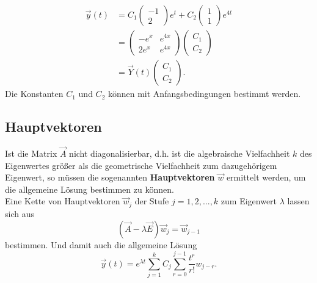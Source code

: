 \begin{align*}
\vec y(t) &= C_1 \begin{pmatrix}-1 \\ 2 \end{pmatrix} e^t + C_2  \begin{pmatrix}1 \\ 1 \end{pmatrix} e^{4t} \\
          &=  \begin{pmatrix}-e^x & e^{4x} \\ 2e^x & e^{4x} \end{pmatrix}  \begin{pmatrix} C_1 \\ C_2 \end{pmatrix} \\
          &= \vec Y(t) \begin{pmatrix} C_1 \\ C_2 \end{pmatrix}.
\end{align*}
Die Konstanten $C_1$ und $C_2$ k\"onnen mit Anfangsbedingungen bestimmt werden.

\subsection*{Hauptvektoren}
Ist die Matrix $\vec A$ nicht diagonalisierbar, d.h. ist die algebraische Vielfachheit $k$ des Eigenwertes gr\"o\ss er als die geometrische Vielfachheit zum dazugeh\"origem Eigenwert, so m\"ussen die sogenannten \textbf{Hauptvektoren} $\vec w$ ermittelt werden, um die allgemeine L\"osung bestimmen zu k\"onnen. \\

\noindent
Eine Kette von Hauptvektoren $\vec w_j$ der Stufe $j=1,2,...,k$ zum Eigenwert $\lambda$ lassen sich aus
$$
(\vec A - \lambda \vec E) \vec w_j = \vec w_{j-1}
$$
bestimmen. Und damit auch die allgemeine L\"osung 
$$
\vec y(t) = e^{\lambda t} \sum_{j=1}^{k} C_j \sum_{r=0}^{j-1} \dfrac{t^r}{r!} w_{j-r}.
$$\\


